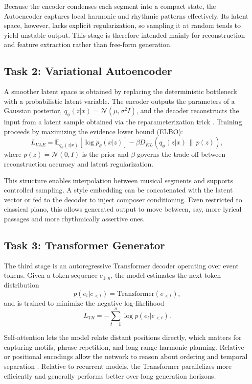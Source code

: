 \documentclass[conference]{IEEEtran}
\begin{document}
Because the encoder condenses each segment into a compact state, the Autoencoder captures local harmonic and rhythmic patterns effectively. Its latent space, however, lacks explicit regularization, so sampling it at random tends to yield unstable output. This stage is therefore intended mainly for reconstruction and feature extraction rather than free-form generation.

\subsection{Task 2: Variational Autoencoder}
A smoother latent space is obtained by replacing the deterministic bottleneck with a probabilistic latent variable. The encoder outputs the parameters of a Gaussian posterior, $q_\phi(z|x) = \mathcal{N}(\mu, \sigma^2 I)$, and the decoder reconstructs the input from a latent sample obtained via the reparameterization trick \cite{vae}. Training proceeds by maximizing the evidence lower bound (ELBO):
\begin{equation}
L_{VAE} = \mathbb{E}_{q_\phi(z|x)}[\log p_\theta(x|z)] - \beta D_{KL}(q_\phi(z|x)\,\|\,p(z)),
\end{equation}
where $p(z) = \mathcal{N}(0, I)$ is the prior and $\beta$ governs the trade-off between reconstruction accuracy and latent regularization.

This structure enables interpolation between musical segments and supports controlled sampling. A style embedding can be concatenated with the latent vector or fed to the decoder to inject composer conditioning. Even restricted to classical piano, this allows generated output to move between, say, more lyrical passages and more rhythmically assertive ones.

\subsection{Task 3: Transformer Generator}
The third stage is an autoregressive Transformer decoder operating over event tokens. Given a token sequence $e_{1:n}$, the model estimates the next-token distribution
\begin{equation}
p(e_t | e_{<t}) = \text{Transformer}(e_{<t}),
\end{equation}
and is trained to minimize the negative log-likelihood
\begin{equation}
L_{TR} = -\sum_{t=1}^{n} \log p(e_t | e_{<t}).
\end{equation}

Self-attention lets the model relate distant positions directly, which matters for capturing motifs, phrase repetition, and long-range harmonic planning. Relative or positional encodings allow the network to reason about ordering and temporal separation \cite{attention, musictransformer}. Relative to recurrent models, the Transformer parallelizes more efficiently and generally performs better over long generation horizons.
\end{document}
